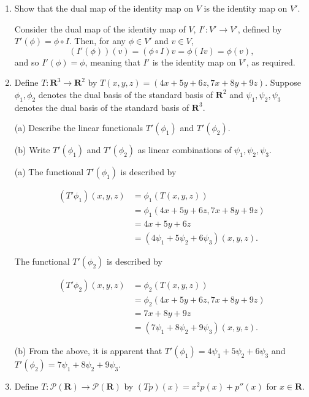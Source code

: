 \documentclass{book}
\begin{document}
\begin{enumerate}
\item Show that the dual map of the identity map on \(V\) is the identity map on \(V'\).

Consider the dual map of the identity map of \(V\), \(I':V' \rightarrow V'\), defined by \(T'(\phi)=\phi \circ I\).  Then, for any \(\phi \in V'\) and \(v \in V\), \[(I'(\phi))(v)=(\phi \circ I)v=\phi(Iv)=\phi(v),\] and so \(I'(\phi)=\phi\), meaning that \(I'\) is the identity map on \(V'\), as required.

\item Define \(T: \textbf{R}^3 \rightarrow \textbf{R}^2\) by \(T(x,y,z)=(4x+5y+6z,7x+8y+9z)\).  Suppose \(\phi_1,\phi_2\) denotes the dual basis of the standard basis of \(\textbf{R}^2\) and \(\psi_1,\psi_2,\psi_3\) denotes the dual basis of the standard basis of \(\textbf{R}^3\).

(a) Describe the linear functionals \(T'(\phi_1)\) and \(T'(\phi_2)\).

(b) Write \(T'(\phi_1)\) and \(T'(\phi_2)\) as linear combinations of \(\psi_1,\psi_2,\psi_3\).

(a) The functional \(T'(\phi_1)\) is described by

\begin{equation*}
    \begin{split}
        (T'\phi_1)(x,y,z) &= \phi_1(T(x,y,z)) \\
        &= \phi_1(4x+5y+6z,7x+8y+9z) \\
        &= 4x+5y+6z \\
        &= (4\psi_1+5\psi_2+6\psi_3)(x,y,z).
    \end{split}
\end{equation*}

The functional \(T'(\phi_2)\) is described by

\begin{equation*}
    \begin{split}
        (T'\phi_2)(x,y,z) &= \phi_2(T(x,y,z)) \\
        &= \phi_2(4x+5y+6z,7x+8y+9z) \\
        &= 7x+8y+9z \\
        &= (7\psi_1+8\psi_2+9\psi_3)(x,y,z).
    \end{split}
\end{equation*}

(b) From the above, it is apparent that \(T'(\phi_1)=4\psi_1+5\psi_2+6\psi_3\) and \(T'(\phi_2)=7\psi_1+8\psi_2+9\psi_3\).

\item Define \(T: \mathcal{P}(\textbf{R}) \rightarrow \mathcal{P}(\textbf{R})\) by \((Tp)(x)=x^2p(x)+p''(x)\) for \(x \in \textbf{R}\).


\end{enumerate}
\end{document}
